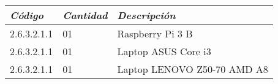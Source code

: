             \begin{table}[h!]
                \centering
                \begin{tabular}{|p{3cm}|p{2cm}|p{5cm}|} \hline
                    
                
                \textit{{\bf{Código}}} &
                \textit{{\bf{Cantidad}}} &
                \textit{{\bf{Descripción}}}
                \\ \hline

                2.6.3.2.1.1 &
                01 &
                Raspberry Pi 3 B
                \\ \hline

                2.6.3.2.1.1 &
                01 &
                Laptop ASUS Core i3
                \\ \hline

                2.6.3.2.1.1&
                01 &
                Laptop LENOVO Z50-70 AMD A8
                \\ \hline

                \end{tabular}
            \end{table}

